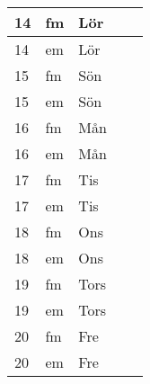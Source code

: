 \documentclass[a4paper]{article}
\begin{document}
\begin{table}[ht!]
\begin{tabular}{lllp{7cm}p{7cm}}
\multicolumn{1}{|l|}{14} & \multicolumn{1}{l|}{fm} & \multicolumn{1}{l|}{Lör} & \multicolumn{1}{l|}{} & \multicolumn{1}{l|}{} \\ \hline
\multicolumn{1}{|l|}{14} & \multicolumn{1}{l|}{em} & \multicolumn{1}{l|}{Lör} & \multicolumn{1}{l|}{} & \multicolumn{1}{l|}{} \\ \hline    

\multicolumn{1}{|l|}{15} & \multicolumn{1}{l|}{fm} & \multicolumn{1}{l|}{Sön} & \multicolumn{1}{l|}{} & \multicolumn{1}{l|}{} \\ \hline
\multicolumn{1}{|l|}{15} & \multicolumn{1}{l|}{em} & \multicolumn{1}{l|}{Sön} & \multicolumn{1}{l|}{} & \multicolumn{1}{l|}{} \\ \hline    

\multicolumn{1}{|l|}{16} & \multicolumn{1}{l|}{fm} & \multicolumn{1}{l|}{Mån} & \multicolumn{1}{l|}{} & \multicolumn{1}{l|}{} \\ \hline
\multicolumn{1}{|l|}{16} & \multicolumn{1}{l|}{em} & \multicolumn{1}{l|}{Mån} & \multicolumn{1}{l|}{} & \multicolumn{1}{l|}{} \\ \hline    

\multicolumn{1}{|l|}{17} & \multicolumn{1}{l|}{fm} & \multicolumn{1}{l|}{Tis} & \multicolumn{1}{l|}{} & \multicolumn{1}{l|}{} \\ \hline
\multicolumn{1}{|l|}{17} & \multicolumn{1}{l|}{em} & \multicolumn{1}{l|}{Tis} & \multicolumn{1}{l|}{} & \multicolumn{1}{l|}{} \\ \hline    

\multicolumn{1}{|l|}{18} & \multicolumn{1}{l|}{fm} & \multicolumn{1}{l|}{Ons} & \multicolumn{1}{l|}{} & \multicolumn{1}{l|}{} \\ \hline
\multicolumn{1}{|l|}{18} & \multicolumn{1}{l|}{em} & \multicolumn{1}{l|}{Ons} & \multicolumn{1}{l|}{} & \multicolumn{1}{l|}{} \\ \hline    

\multicolumn{1}{|l|}{19} & \multicolumn{1}{l|}{fm} & \multicolumn{1}{l|}{Tors} & \multicolumn{1}{l|}{} & \multicolumn{1}{l|}{} \\ \hline
\multicolumn{1}{|l|}{19} & \multicolumn{1}{l|}{em} & \multicolumn{1}{l|}{Tors} & \multicolumn{1}{l|}{} & \multicolumn{1}{l|}{} \\ \hline    

\multicolumn{1}{|l|}{20} & \multicolumn{1}{l|}{fm} & \multicolumn{1}{l|}{Fre} & \multicolumn{1}{l|}{} & \multicolumn{1}{l|}{} \\ \hline
\multicolumn{1}{|l|}{20} & \multicolumn{1}{l|}{em} & \multicolumn{1}{l|}{Fre} & \multicolumn{1}{l|}{} & \multicolumn{1}{l|}{} \\ \hline    


\end{tabular}
\end{table}
\end{document}
